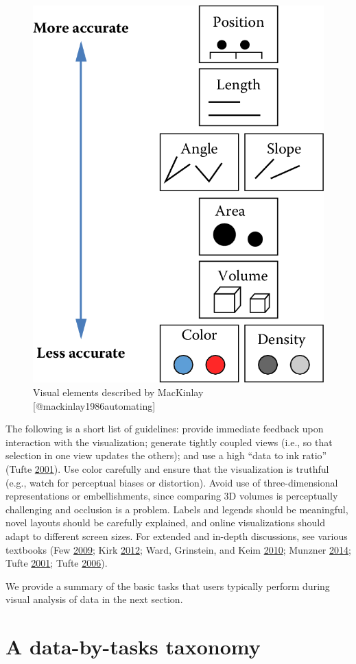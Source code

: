 \documentclass[]{krantz}
\begin{document}
\begin{figure}

{\centering \includegraphics[width=0.5\linewidth]{ChapterViz/figures/fig9-4} 

}

\caption{Visual elements described by MacKinlay [@mackinlay1986automating]}\label{fig:fig9-4}
\end{figure}

The following is a short list of guidelines: provide immediate feedback
upon interaction with the visualization; generate tightly coupled views
(i.e., so that selection in one view updates the others); and use a high
``data to ink ratio'' (Tufte
\protect\hyperlink{ref-edward2001visual}{2001}). Use color carefully and
ensure that the visualization is truthful (e.g., watch for perceptual
biases or distortion). Avoid use of three-dimensional representations or
embellishments, since comparing 3D volumes is perceptually challenging
and occlusion is a problem. Labels and legends should be meaningful,
novel layouts should be carefully explained, and online visualizations
should adapt to different screen sizes. For extended and in-depth
discussions, see various textbooks (Few
\protect\hyperlink{ref-few2009now}{2009}; Kirk
\protect\hyperlink{ref-kirk2012data}{2012}; Ward, Grinstein, and Keim
\protect\hyperlink{ref-ward2010interactive}{2010}; Munzner
\protect\hyperlink{ref-munzner2014visualization}{2014}; Tufte
\protect\hyperlink{ref-edward2001visual}{2001}; Tufte
\protect\hyperlink{ref-edward2006beauty}{2006}).

We provide a summary of the basic tasks that users typically perform
during visual analysis of data in the next section.

\section{A data-by-tasks taxonomy}\label{sec:viz-3}
\end{document}
